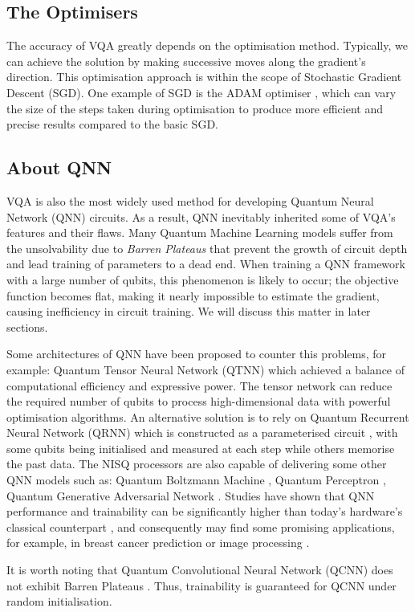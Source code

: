 \subsection{The Optimisers}
The accuracy of VQA greatly depends on the optimisation method.
Typically, we can achieve the solution by making successive moves along the gradient's direction.
This optimisation approach is within the scope of Stochastic Gradient Descent (SGD).
One example of SGD is the ADAM optimiser \cite{kingmaAdamMethodStochastic2014}, which can vary the size of the steps taken during optimisation to produce more efficient and precise results compared to the basic SGD.


\subsection{About QNN}
VQA is also the most widely used method for developing Quantum Neural Network (QNN) circuits. 
As a result, QNN inevitably inherited some of VQA's features and their flaws.
Many Quantum Machine Learning models suffer from the unsolvability due to \textit{Barren Plateaus} \cite{zhaoReviewQuantumNeural2021} that prevent the growth of circuit depth and lead training of parameters to a dead end.
When training a QNN framework with a large number of qubits, this phenomenon is likely to occur; the objective function becomes flat, making it nearly impossible to estimate the gradient, \cite{mccleanBarrenPlateausQuantum2018, zhaoAnalyzingBarrenPlateau2021} causing inefficiency in circuit training. We will discuss this matter in later sections.

Some architectures of QNN have been proposed to counter this problems, for example: 
Quantum Tensor Neural Network (QTNN) \cite{hugginsQuantumMachineLearning2019} which achieved a balance of computational efficiency and expressive power. 
The tensor network can reduce the required number of qubits to process high-dimensional data with powerful optimisation algorithms.
An alternative solution is to rely on Quantum Recurrent Neural Network (QRNN) which is constructed as a parameterised circuit \cite{takakiLearningTemporalData2021}, with some qubits being initialised and measured at each step while others memorise the past data.
The NISQ processors are also capable of delivering some other QNN models such as: 
Quantum Boltzmann Machine \cite{shinguBoltzmannMachineLearning2021, zoufalVariationalQuantumBoltzmann2021}, 
Quantum Perceptron \cite{kristensenArtificialSpikingQuantum2021}, 
Quantum Generative Adversarial Network \cite{dallaire-demersQuantumGenerativeAdversarial2018, lloydQuantumGenerativeAdversarial2018}. 
Studies have shown that QNN performance and trainability can be significantly higher than today's hardware's classical counterpart \cite{abbasPowerQuantumNeural2021, colesSeekingQuantumAdvantage2021}, and consequently may find some promising applications, for example, in breast cancer prediction \cite{liModelAlgorithmQuantuminspired2014} or image processing \cite{matsuiQubitNeuralNetwork2009}.

It is worth noting that Quantum Convolutional Neural Network (QCNN) does not exhibit Barren Plateaus \cite{pesahAbsenceBarrenPlateaus2021}.
Thus, trainability is guaranteed for QCNN under random initialisation.